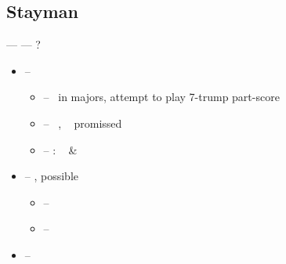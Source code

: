 \subsection{Stayman}
\label{subsec:stayman}

 ---  --- ?
\begin{itemize}
  \item {} -- \art\ \no\ 
  \begin{itemize}
    \item {} -- \so\ in majors, attempt to play 7-trump part-score
    \item {} -- \nat\ \inv, \no\  promissed
    \item {} -- : \gf\  \& 
  \end{itemize}
  \item {} -- , possible 
  \begin{itemize}
    \item {} -- \inv\ 
    \item {} -- \inv\ \no\ 
  \end{itemize}
  \item {} -- 
\end{itemize}
